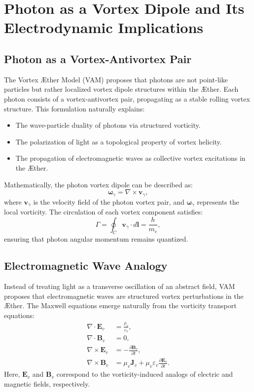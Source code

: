 \documentclass[aps,preprint,superscriptaddress]{revtex4-2}
\begin{document}


\section{Photon as a Vortex Dipole and Its Electrodynamic Implications}

\subsection{Photon as a Vortex-Antivortex Pair}
The Vortex \AE ther Model (VAM) proposes that photons are not point-like particles but rather localized vortex dipole structures within the \AE ther. Each photon consists of a vortex-antivortex pair, propagating as a stable rolling vortex structure. This formulation naturally explains:
\begin{itemize}
\item The wave-particle duality of photons via structured vorticity.
\item The polarization of light as a topological property of vortex helicity.
\item The propagation of electromagnetic waves as collective vortex excitations in the \AE ther.
\end{itemize}

Mathematically, the photon vortex dipole can be described as:
\begin{equation}
\boldsymbol{\omega}_{\gamma} = \nabla \times \mathbf{v}_{\gamma},
\end{equation}
where $\mathbf{v}_{\gamma}$ is the velocity field of the photon vortex pair, and $\boldsymbol{\omega}_{\gamma}$ represents the local vorticity. The circulation of each vortex component satisfies:
\begin{equation}
\Gamma = \oint_C \mathbf{v}_{\gamma} \cdot d\mathbf{l} = \frac{h}{m_e},
\end{equation}
ensuring that photon angular momentum remains quantized.

\subsection{Electromagnetic Wave Analogy}
Instead of treating light as a transverse oscillation of an abstract field, VAM proposes that electromagnetic waves are structured vortex perturbations in the \AE ther. The Maxwell equations emerge naturally from the vorticity transport equations:
\begin{align}
\nabla \cdot \mathbf{E}_v &= \frac{\rho_v}{\varepsilon_v}, \\
\nabla \cdot \mathbf{B}_v &= 0, \\
\nabla \times \mathbf{E}_v &= - \frac{\partial \mathbf{B}_v}{\partial t}, \\
\nabla \times \mathbf{B}_v &= \mu_v \mathbf{J}_v + \mu_v \varepsilon_v \frac{\partial \mathbf{E}_v}{\partial t}.
\end{align}
Here, $\mathbf{E}_v$ and $\mathbf{B}_v$ correspond to the vorticity-induced analogs of electric and magnetic fields, respectively.
\end{document}
